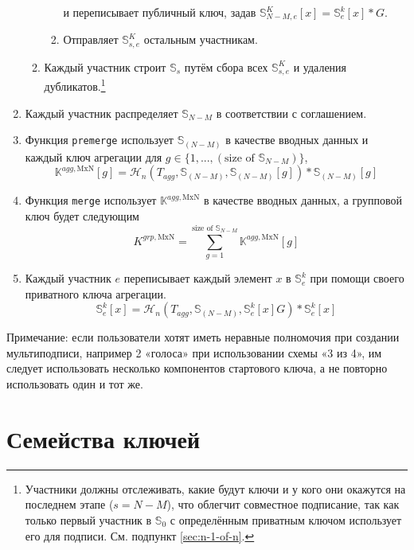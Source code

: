 \begin{enumerate}
\begin{enumerate}
\begin{enumerate}
           и переписывает публичный ключ, задав $\mathbb{S}^K_{N-M,e}[x] = \mathbb{S}^{k}_{e}[x]*G$.
            \item Отправляет $\mathbb{S}^K_{s,e}$ остальным участникам.
        \end{enumerate}
        \item Каждый участник строит $\mathbb{S}_{s}$ путём сбора всех $\mathbb{S}^K_{s,e}$ и удаления дубликатов.\footnote{Участники должны отслеживать, какие будут ключи и у кого они окажутся на последнем этапе ($s = N-M$), что облегчит совместное подписание, так как только первый участник в $\mathbb{S}_0$ с определённым приватным ключом использует его для подписи. См. подпункт \ref{sec:n-1-of-n}.}
    \end{enumerate}
    \item Каждый участник распределяет $\mathbb{S}_{N-M}$ в соответствии с соглашением.
    \item Функция {\tt premerge} использует $\mathbb{S}_{(N-M)}$ в качестве вводных данных и каждый ключ агрегации для \(g \in \{1,...,(\textrm{size of }\mathbb{S}_{N-M})\}\),\vspace{.175cm}
    \[\mathbb{K}^{agg,\textrm{MxN}}[g] = \mathcal{H}_n(T_{agg},\mathbb{S}_{(N-M)},\mathbb{S}_{(N-M)}[g])*\mathbb{S}_{(N-M)}[g]\]
    \item Функция {\tt merge} использует $\mathbb{K}^{agg,\textrm{MxN}}$ в качестве вводных данных, а групповой ключ будет следующим\vspace{.175cm}
    \[K^{grp,\textrm{MxN}} = \sum^{\textrm{size of }\mathbb{S}_{N-M}}_{g = 1} \mathbb{K}^{agg,\textrm{MxN}}[g]\]
    \item Каждый участник $e$ переписывает каждый элемент $x$ в $\mathbb{S}^k_{e}$ при помощи своего приватного ключа агрегации.\vspace{.175cm}
    \[ \mathbb{S}^k_{e}[x] = \mathcal{H}_n(T_{agg},\mathbb{S}_{(N-M)},\mathbb{S}^k_{e}[x] G)*\mathbb{S}^k_{e}[x] \]
\end{enumerate}

Примечание: если пользователи хотят иметь неравные полномочия при создании мультипод\-писи, например 2 «голоса» при использовании схемы «3 из 4», им следует использовать несколько компонентов стартового ключа, а не повторно использовать один и тот же.



\section{Семейства ключей}
\label{sec:general-key-families}

